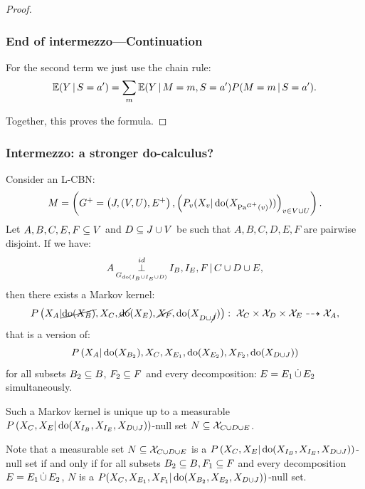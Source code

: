 \begin{proof}
\subsubsection{End of intermezzo---Continuation}

For the second term we just use the chain rule:
$$\mathbb{E}(Y \operatorname*{|} S=a') = \sum_m \mathbb{E}(Y \operatorname*{|} M=m, S=a') P(M=m \operatorname*{|} S=a').$$

Together, this proves the formula.
\end{proof}

\subsubsection{Intermezzo: a stronger do-calculus?}
\begin{Prp}\label{prp:do-calculus-one}
  Consider an L-CBN:
  \[M= \left ( G^+=\left ( J,(V,U),E^+ \right ), \left ( P_v ( X_v|\operatorname{do}( X_{\mathrm{Pa}^{G^+}(v)})) \right )_{v \in V \cup U} \right ).\]
  Let $A,B,C,E,F \subseteq V$ and $D \subseteq J \cup V$ be such that $A,B,C,D,E,F$ are pairwise disjoint.
  If we have:
    \[ A \operatorname*{\perp}^{id}_{G_{\operatorname{do}(I_B \cup I_E \cup D)}} I_B,I_E,F \operatorname*{|} C \cup D \cup E,   \]
  then there exists a Markov kernel: 
    \[P\left ( X_A|\cancel{\operatorname{do}(X_B)},X_C,\cancel{\operatorname{do}}(X_E),\cancel{X_F},\operatorname{do}(X_{D\cup \cancel{J}})\right ):\; \mathcal{X}_C \times \mathcal{X}_{D} \times \mathcal{X}_E \dashrightarrow \mathcal{X}_A,\] 
  that is a version of:  
    \[ P\left ( X_A|\operatorname{do}(X_{B_2}),X_C,X_{E_1},\operatorname{do}(X_{E_2}),X_{F_2},\operatorname{do}(X_{D\cup J})\right )\]
  for all subsets $B_2 \subseteq B$, $F_2 \subseteq F$ and every decomposition: $E=E_1\,\dot{\cup}\, E_2$ simultaneously. 

  Such a Markov kernel is unique up to a measurable $P\left ( X_C,X_E|\operatorname{do}(X_{I_B},X_{I_E},X_{D\cup J})\right )$-null set $N \subseteq \mathcal{X}_{C\cup D\cup E}$.

  Note that a measurable set $N \subseteq \mathcal{X}_{C\cup D\cup E}$ is a $P\left ( X_C,X_E|\operatorname{do}(X_{I_B},X_{I_E},X_{D\cup J})\right )$-null set if and only if for all subsets $B_2 \subseteq B, F_1 \subseteq F$ and every decomposition $E=E_1\,\dot{\cup}\, E_2$, $N$ is a $P(X_C,X_{E_1},X_{F_1}|\operatorname{do}(X_{B_2},X_{E_2},X_{D\cup J}))$-null set.
\end{Prp}
